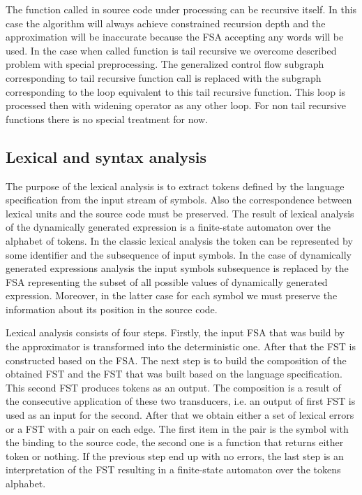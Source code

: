 \documentclass{sig-alternate-05-2015}
\begin{document}
The function called in source code under processing can be recursive itself. In this case the algorithm will always achieve constrained recursion depth and the approximation will be inaccurate because the FSA accepting any words will be used. In the case when called function is tail recursive we overcome described problem with special preprocessing. The generalized control flow subgraph  corresponding to tail recursive function call is replaced with the subgraph corresponding to the loop equivalent to this tail recursive function. This loop is processed then with widening operator as any other loop. For non tail recursive functions there is no special treatment for now.

\subsection{Lexical and syntax analysis}

The purpose of the lexical analysis is to extract tokens defined by the language specification from the input stream of symbols. Also the correspondence between lexical units and the source code must be preserved. The result of lexical analysis of the dynamically generated expression is a finite-state automaton over the alphabet of tokens. In the classic lexical analysis the token can be represented by some identifier and the subsequence of input symbols. In the case of dynamically generated expressions analysis the input symbols subsequence is replaced by the FSA representing the subset of all possible values of dynamically generated expression. Moreover, in the latter case for each symbol we must preserve the information about its position in the source code.

Lexical analysis consists of four steps. Firstly, the input FSA that was build by the approximator is transformed into the deterministic one. After that the FST is constructed based on the FSA. The next step is to build the composition of the obtained FST and the FST that was built based on the language specification. This second FST produces tokens as an output. The composition is a result of the consecutive application of these two transducers, i.e. an output of first FST is used as an input for the second. After that we obtain either a set of lexical errors or a FST with a pair on each edge. The first item in the pair is the symbol with the binding to the source code, the second one is a function that returns either token or nothing. If the previous step end up with no errors, the last step is an interpretation of the FST resulting in a finite-state automaton over the tokens alphabet.
\end{document}
